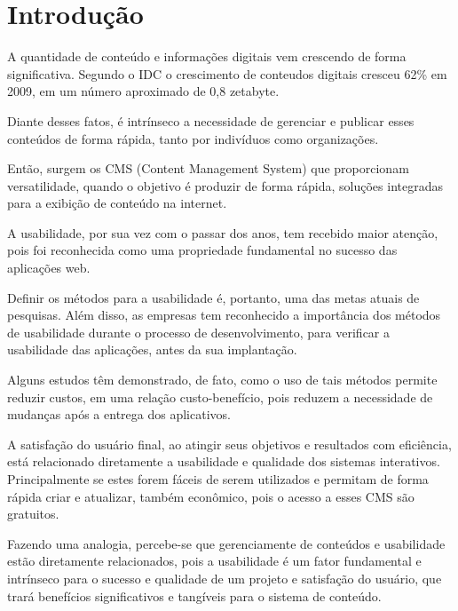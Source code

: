 \chapter{Introdução}

A quantidade de conteúdo e informações digitais vem crescendo de forma significativa. Segundo o IDC o crescimento de conteudos digitais cresceu 62\% em 2009, em um número aproximado de 0,8 zetabyte.

Diante desses fatos, é intrínseco a necessidade de gerenciar e publicar esses conteúdos de forma rápida, tanto por indivíduos como organizações.

Então, surgem os CMS (Content Management System) que proporcionam versatilidade, quando o objetivo é produzir de forma rápida, soluções integradas para a exibição de conteúdo na internet.

A usabilidade, por sua vez com o passar dos anos, tem recebido maior atenção, pois foi reconhecida como uma propriedade fundamental no sucesso das aplicações web.

Definir os métodos para a usabilidade é, portanto, uma das metas atuais de pesquisas. Além disso, as empresas tem reconhecido a importância dos métodos de usabilidade durante o processo de desenvolvimento, para verificar a usabilidade das aplicações, antes da sua implantação.

Alguns estudos têm demonstrado, de fato, como o uso de tais métodos permite reduzir custos, em uma relação custo-benefício, pois reduzem a necessidade de mudanças após a entrega dos aplicativos.

A satisfação do usuário final, ao atingir seus objetivos e resultados com eficiência, está relacionado diretamente a usabilidade e qualidade dos sistemas interativos. Principalmente se estes forem fáceis de serem utilizados e permitam de forma rápida criar e atualizar, também econômico, pois o acesso a esses CMS são gratuitos.

Fazendo uma analogia, percebe-se  que gerenciamente de conteúdos e usabilidade estão diretamente relacionados, pois a usabilidade é um fator fundamental e intrínseco para o sucesso e qualidade de um projeto e satisfação do usuário, que trará benefícios significativos e tangíveis para o sistema de conteúdo.


